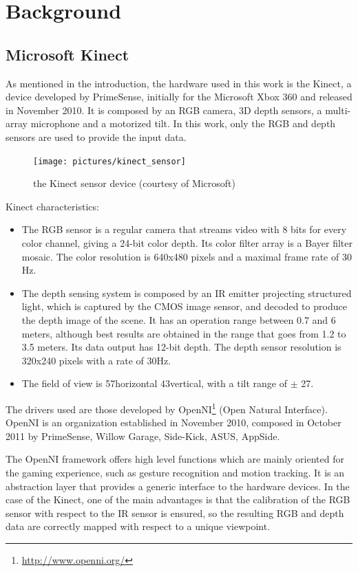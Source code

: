 \chapter{Background}
\label{chap:background}

\section{Microsoft Kinect}

As mentioned in the introduction, the hardware used in this work is the Kinect, a device developed by PrimeSense, initially for the Microsoft Xbox 360 and released in November 2010. It is composed by an RGB camera, 3D depth sensors, a multi-array microphone and a motorized tilt. In this work, only the RGB and depth sensors are used to provide the input data.

\begin{figure}[H]
\centering
\texttt{[image: pictures/kinect\_sensor]}
\caption{the Kinect sensor device (courtesy of Microsoft)}
\end{figure}

Kinect characteristics:
\begin{itemize}
 \item The RGB sensor is a regular camera that streams video with 8 bits for every color channel, giving a 24-bit color depth. Its  color filter array is a Bayer filter mosaic. The color resolution is 640x480 pixels and a maximal frame rate of 30 Hz.
 \item The depth sensing system is composed by an IR emitter projecting structured light, which is captured by the CMOS image sensor, and decoded to produce the depth image of the scene. It has an operation range between 0.7 and 6 meters, although best results are obtained in the range that goes from 1.2 to 3.5 meters. Its data output has 12-bit depth. The depth sensor resolution is 320x240 pixels with a rate of 30Hz.
 \item The field of view is 57\textdegree horizontal 43\textdegree vertical, with a tilt range of $\pm$ 27\textdegree.
\end{itemize}

The drivers used are those developed by OpenNI\footnote{\url{http://www.openni.org/}} (Open Natural Interface). OpenNI is an organization established in November 2010, composed in October 2011 by PrimeSense, Willow Garage, Side-Kick, ASUS, AppSide.

The OpenNI framework offers high level functions which are mainly oriented for the gaming experience, such as gesture recognition and motion tracking. It is an abstraction layer that provides a generic interface to the hardware devices. In the case of the Kinect, one of the main advantages is that the calibration of the RGB sensor with respect to the IR sensor is ensured, so the resulting RGB and depth data are correctly mapped with respect to a unique viewpoint.


